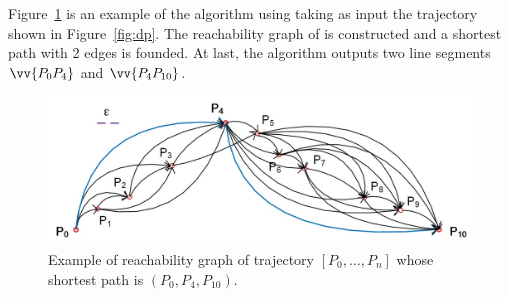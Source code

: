 \begin{example}
	\label{exm-alg-optimal}
	Figure~\ref{fig:optimal} is an example of the \opt algorithm using \ped taking as input the trajectory  shown in Figure~\ref{fig:dp}. The reachability graph of  is constructed and a shortest path with 2 edges is founded.
	At last, the algorithm outputs two line segments $\vv{P_0P_4}$ and $\vv{P_4P_{10}}$.	
\end{example}
\vspace{-1ex}

\begin{figure}[tb!]
	\centering
	\includegraphics[scale=0.75]{Figures/Fig-Optimal.jpg}\vspace{-1ex}
	\caption{\small Example of reachability graph of trajectory $[P_0, \ldots, P_n]$ whose shortest path is $(P_0, P_4, P_{10})$.}	\vspace{-3ex}
	\label{fig:optimal}
\end{figure}









